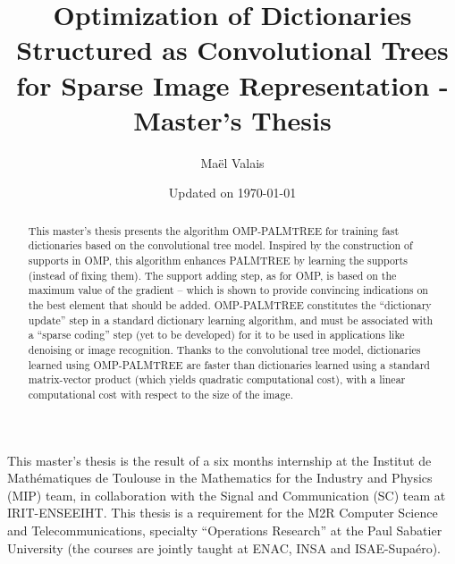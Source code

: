 \author{Maël Valais}
\date{Updated on \today}
\title{Optimization of Dictionaries Structured as Convolutional Trees for Sparse Image Representation - Master’s Thesis}

\pagestyle{empty} \restoregeometry
\pagestyle{body}
\begin{abstract}
This master’s thesis presents the algorithm OMP-PALMTREE for training fast dictionaries based on the convolutional tree model. Inspired by the construction of supports in OMP, this algorithm enhances PALMTREE by learning the supports (instead of fixing them). The  support adding step, as for OMP, is based on the maximum value of the gradient – which is shown to provide convincing indications on the best element that should be added. OMP-PALMTREE constitutes the “dictionary update” step in a standard dictionary learning algorithm, and must be associated with a “sparse coding” step (yet to be developed) for it to be used in applications like denoising or image recognition. Thanks to the convolutional tree model, dictionaries learned using OMP-PALMTREE are faster than dictionaries learned using a standard matrix-vector product (which yields quadratic computational cost), with a linear computational cost with respect to the size of the image.

\end{abstract}


\vfill
\begin{foreword}[Foreword]
This master's thesis is the result of a six months internship  at the Institut de Mathématiques de Toulouse in the Mathematics for the Industry and Physics (MIP) team, in collaboration with the Signal and Communication (SC) team at IRIT\footnotemark[1]-ENSEEIHT\footnotemark[2]. This thesis is a requirement for the M2R Computer Science and Telecommunications, specialty “Operations Research” at the Paul Sabatier University (the courses are jointly taught at ENAC, INSA and ISAE-Supaéro).
\end{foreword}


